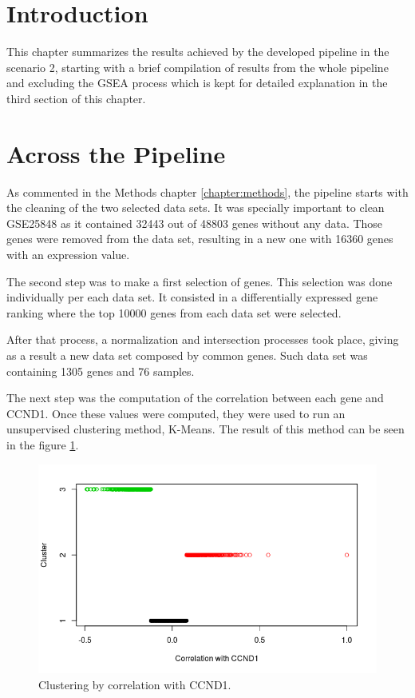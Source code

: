 
\section{Introduction}
This chapter summarizes the results achieved by the developed pipeline in the scenario 2, starting with a brief compilation of results from the whole pipeline and excluding the GSEA process which is kept for detailed explanation in the third section of this chapter.

\section{Across the Pipeline}

As commented in the Methods chapter \ref{chapter:methods}, the pipeline starts with the cleaning of the two selected data sets.
It was specially important to clean GSE25848 as it contained 32443 out of 48803 genes without any data. Those genes were removed from the data set, resulting in a new one with 16360 genes with an expression value.

The second step was to make a first selection of genes. This selection was done individually per each data set. It consisted in a differentially expressed gene ranking where the top 10000 genes from each data set were selected.

After that process, a normalization and intersection processes took place, giving as a result a new data set composed by common genes. Such data set was containing 1305 genes and 76 samples.

The next step was the computation of the correlation between each gene and CCND1. Once these values were computed, they were used to run an unsupervised clustering method, K-Means. The result of this method can be seen in the figure \ref{fig:cor_cluster}.

\begin{figure}[h!]
    \centering
    \includegraphics[scale=0.5]{../figs/cor_cluster.png}
    \caption{Clustering by correlation with CCND1.}
    \label{fig:cor_cluster}
\end{figure}

